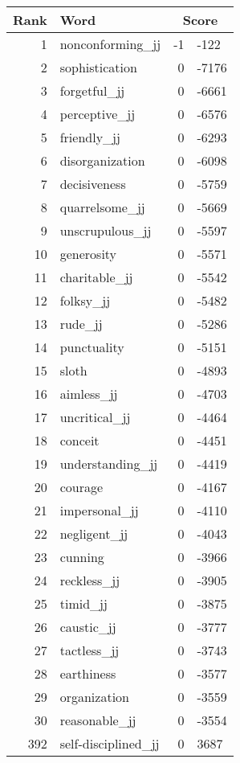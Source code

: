 \begin{longtable}[!htbp]{| rlr@{.}l |}
    \hline
    \textbf{Rank} & \textbf{Word} & \multicolumn{2}{c|}{\textbf{Score}} \\
    \hline
    \endhead
    1 & nonconforming\_jj & -1 & -122 \\
    2 & sophistication & 0 & -7176 \\
    3 & forgetful\_jj & 0 & -6661 \\
    4 & perceptive\_jj & 0 & -6576 \\
    5 & friendly\_jj & 0 & -6293 \\
    6 & disorganization & 0 & -6098 \\
    7 & decisiveness & 0 & -5759 \\
    8 & quarrelsome\_jj & 0 & -5669 \\
    9 & unscrupulous\_jj & 0 & -5597 \\
    10 & generosity & 0 & -5571 \\
    11 & charitable\_jj & 0 & -5542 \\
    12 & folksy\_jj & 0 & -5482 \\
    13 & rude\_jj & 0 & -5286 \\
    14 & punctuality & 0 & -5151 \\
    15 & sloth & 0 & -4893 \\
    16 & aimless\_jj & 0 & -4703 \\
    17 & uncritical\_jj & 0 & -4464 \\
    18 & conceit & 0 & -4451 \\
    19 & understanding\_jj & 0 & -4419 \\
    20 & courage & 0 & -4167 \\
    21 & impersonal\_jj & 0 & -4110 \\
    22 & negligent\_jj & 0 & -4043 \\
    23 & cunning & 0 & -3966 \\
    24 & reckless\_jj & 0 & -3905 \\
    25 & timid\_jj & 0 & -3875 \\
    26 & caustic\_jj & 0 & -3777 \\
    27 & tactless\_jj & 0 & -3743 \\
    28 & earthiness & 0 & -3577 \\
    29 & organization & 0 & -3559 \\
    30 & reasonable\_jj & 0 & -3554 \\
    392 & self-disciplined\_jj & 0 & 3687 \\

\end{longtable}
